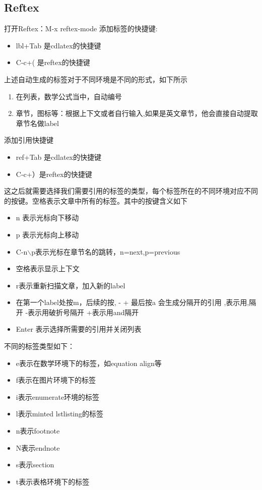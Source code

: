\documentclass[UTF8]{ctexart}
\begin{document}
\subsection{Reftex}
打开Reftex：M-x reftex-mode
添加标签的快捷键:
\begin{itemize}
\item lbl+Tab 是cdlatex的快捷键
\item C-c+( 是reftex的快捷键
\end{itemize}
上述自动生成的标签对于不同环境是不同的形式，如下所示
\begin{enumerate}
\item 在列表，数学公式当中，自动编号
\item 章节，图标等：根据上下文或者自行输入,如果是英文章节，他会直接自动提取章节名做label
\end{enumerate}
添加引用快捷键
\begin{itemize}
\item ref+Tab 是cdlatex的快捷键
\item C-c+）是reftex的快捷键
\end{itemize}
这之后就需要选择我们需要引用的标签的类型，每个标签所在的不同环境对应不同的按键。空格表示文章中所有的标签。其中的按键含义如下
\begin{itemize}
\item n 表示光标向下移动
\item p 表示光标向上移动
\item C-n$\backslash$p表示光标在章节名的跳转，n=next,p=previous
\item 空格表示显示上下文
\item r表示重新扫描文章，加入新的label
\item 在第一个label处按m，后续的按, - + 最后按a 会生成分隔开的引用 ,表示用,隔开 -表示用破折号隔开 +表示用and隔开
\item Enter 表示选择所需要的引用并关闭列表
\end{itemize}

不同的标签类型如下：
\begin{itemize}
\item e表示在数学环境下的标签，如equation align等
\item f表示在图片环境下的标签
\item i表示enumerate环境的标签
\item l表示minted lstlisting的标签
\item n表示footnote
\item N表示endnote
\item s表示section
\item t表示表格环境下的标签
\end{itemize}
\end{document}
